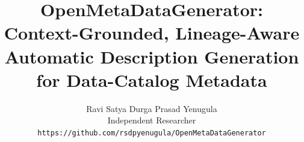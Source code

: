 \documentclass[11pt]{article}
\title{\textbf{OpenMetaDataGenerator: Context-Grounded, Lineage-Aware\\
Automatic Description Generation for Data-Catalog Metadata}}
\author{%
  Ravi Satya Durga Prasad Yenugula\\
  Independent Researcher\\
  \texttt{https://github.com/rsdpyenugula/OpenMetaDataGenerator}
}
\date{}
\begin{document}
\maketitle

\newcommand{\REPO}{\url{https://github.com/rsdpyenugula/OpenMetaDataGenerator}}




\end{document}
